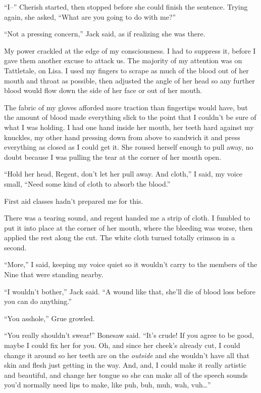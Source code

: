 ``I--'' Cherish started, then stopped before she could finish the sentence.  Trying again, she asked, ``What are you going to do with me?''



``Not a pressing concern,'' Jack said, as if realizing she was there.



My power crackled at the edge of my consciousness.  I had to suppress it, before I gave them another excuse to attack us.  The majority of my attention was on Tattletale, on Lisa. I used my fingers to scrape as much of the blood out of her mouth and throat as possible, then adjusted the angle of her head so any further blood would flow down the side of her face or out of her mouth.



The fabric of my gloves afforded more traction than fingertips would have, but the amount of blood made everything slick to the point that I couldn't be sure of what I was holding.  I had one hand inside her mouth, her teeth hard against my knuckles, my other hand pressing down from above to sandwich it and press everything as closed as I could get it.  She roused herself enough to pull away, no doubt because I was pulling the tear at the corner of her mouth open.



``Hold her head, Regent, don't let her pull away.  And cloth,'' I said, my voice small, ``Need some kind of cloth to absorb the blood.''



First aid classes hadn't prepared me for this.



There was a tearing sound, and regent handed me a strip of cloth.  I fumbled to put it into place at the corner of her mouth, where the bleeding was worse, then applied the rest along the cut.  The white cloth turned totally crimson in a second.



``More,'' I said, keeping my voice quiet so it wouldn't carry to the members of the Nine that were standing nearby.



``I wouldn't bother,'' Jack said.  ``A wound like that, she'll die of blood loss before you can do anything.''



``You asshole,'' Grue growled.



``You really shouldn't swear!'' Bonesaw said.  ``It's crude!  If you agree to be good, maybe I could fix her for you.  Oh, and since her cheek's already cut, I could change it around so her teeth are on the \emph{outside} and she wouldn't have all that skin and flesh just getting in the way.  And, and, I could make it really artistic and beautiful, and change her tongue so she can make all of the speech sounds you'd normally need lips to make, like puh, buh, muh, wah, vuh\ldots''



